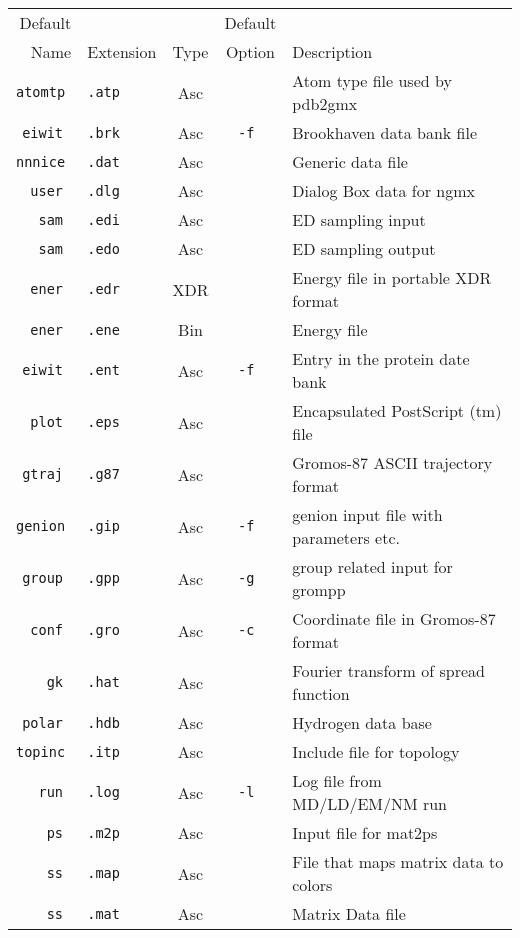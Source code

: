 \begin{table}[p]
\begin{tabularx}{\linewidth}{rlccX}
\hline
   Default  &         &     & Default & \\
   Name     & Extension & Type& Option  & Description \\
\hline
\tt  atomtp &\tt .atp & Asc &\tt    & Atom type file used by pdb2gmx \\
\tt   eiwit &\tt .brk & Asc &\tt -f & Brookhaven data bank file \\
\tt  nnnice &\tt .dat & Asc &\tt    & Generic data file \\
\tt    user &\tt .dlg & Asc &\tt    & Dialog Box data for ngmx \\
\tt     sam &\tt .edi & Asc &\tt    & ED sampling input \\
\tt     sam &\tt .edo & Asc &\tt    & ED sampling output \\
\tt    ener &\tt .edr & XDR &\tt    & Energy file in portable XDR format \\
\tt    ener &\tt .ene & Bin &\tt    & Energy file \\
\tt   eiwit &\tt .ent & Asc &\tt -f & Entry in the protein date bank \\
\tt    plot &\tt .eps & Asc &\tt    & Encapsulated PostScript (tm) file \\
\tt   gtraj &\tt .g87 & Asc &\tt    & Gromos-87 ASCII trajectory format \\
\tt  genion &\tt .gip & Asc &\tt -f & genion input file with parameters etc. \\
\tt   group &\tt .gpp & Asc &\tt -g & group related input for grompp \\
\tt    conf &\tt .gro & Asc &\tt -c & Coordinate file in Gromos-87 format \\
\tt      gk &\tt .hat & Asc &\tt    & Fourier transform of spread function \\
\tt   polar &\tt .hdb & Asc &\tt    & Hydrogen data base \\
\tt  topinc &\tt .itp & Asc &\tt    & Include file for topology \\
\tt     run &\tt .log & Asc &\tt -l & Log file from MD/LD/EM/NM run \\
\tt      ps &\tt .m2p & Asc &\tt    & Input file for mat2ps \\
\tt      ss &\tt .map & Asc &\tt    & File that maps matrix data to colors \\
\tt      ss &\tt .mat & Asc &\tt    & Matrix Data file \\

\end{tabularx}
\end{table}
